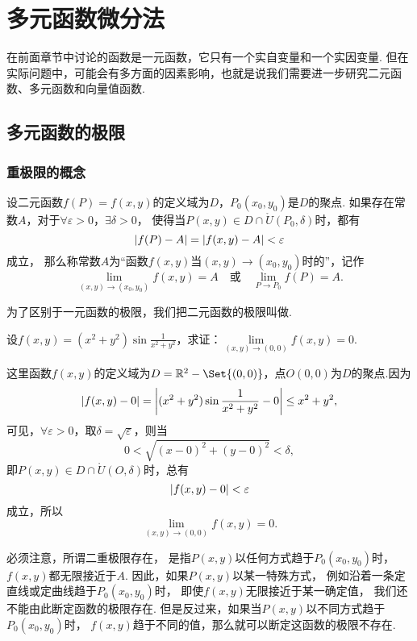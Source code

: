 \chapter{多元函数微分法}
在前面章节中讨论的函数是一元函数，它只有一个实自变量和一个实因变量.
但在实际问题中，可能会有多方面的因素影响，也就是说我们需要进一步研究二元函数、多元函数和向量值函数.

\section{多元函数的极限}
\subsection{重极限的概念}
\begin{definition}
设二元函数\(f(P)=f(x,y)\)的定义域为\(D\)，\(P_0(x_0,y_0)\)是\(D\)的聚点.
如果存在常数\(A\)，对于\(\forall \varepsilon > 0\)，\(\exists \delta > 0\)，
使得当\(P(x,y) \in D \cap \mathring{U}(P_0,\delta)\)时，都有\[
	\abs{f(P)-A} = \abs{f(x,y)-A} < \varepsilon
\]成立，
那么称常数\(A\)为“函数\(f(x,y)\)当\((x,y)\to(x_0,y_0)\)时的”，记作\[
	\lim\limits_{(x,y)\to(x_0,y_0)} f(x,y) = A
	\quad\text{或}\quad
	\lim\limits_{P \to P_0} f(P) = A.
\]

为了区别于一元函数的极限，我们把二元函数的极限叫做.
\end{definition}

\begin{example}
设\(f(x,y) = (x^2+y^2) \sin\frac{1}{x^2+y^2}\)，求证：\(\lim\limits_{(x,y)\to(0,0)} f(x,y) = 0\).
\begin{solution}
这里函数\(f(x,y)\)的定义域为\(D = \mathbb{R}^2 - \Set{(0,0)}\)，点\(O(0,0)\)为\(D\)的聚点.因为\[
\abs{f(x,y)-0}
= \abs{(x^2+y^2) \sin\frac{1}{x^2+y^2} - 0}
\leq x^2+y^2,
\]可见，\(\forall\varepsilon>0\)，取\(\delta=\sqrt{\varepsilon}\)，则当\[
0 < \sqrt{(x-0)^2+(y-0)^2} < \delta,
\]即\(P(x,y) \in D \cap \mathring{U}(O,\delta)\)时，总有\[
\abs{f(x,y)-0} < \varepsilon
\]成立，所以\[
\lim\limits_{(x,y)\to(0,0)} f(x,y) = 0.
\]
\end{solution}
\end{example}

必须注意，所谓二重极限存在，
是指\(P(x,y)\)以任何方式趋于\(P_0(x_0,y_0)\)时，\(f(x,y)\)都无限接近于\(A\).
因此，如果\(P(x,y)\)以某一特殊方式，
例如沿着一条定直线或定曲线趋于\(P_0(x_0,y_0)\)时，
即使\(f(x,y)\)无限接近于某一确定值，
我们还不能由此断定函数的极限存在.
但是反过来，如果当\(P(x,y)\)以不同方式趋于\(P_0(x_0,y_0)\)时，
\(f(x,y)\)趋于不同的值，那么就可以断定这函数的极限不存在.

